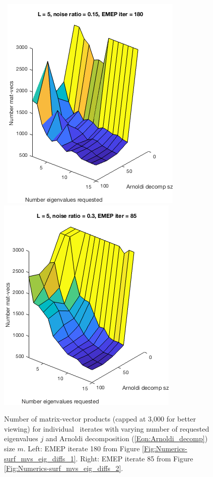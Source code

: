 \begin{figure}[H]
\centering
\hbox{\hspace{-0.3cm} 
	\includegraphics[scale=0.65]{Numerics-surf_mvs_for_m_vs_j_1}
	\includegraphics[scale=0.65]{Numerics-surf_mvs_for_m_vs_j_2} 
			}
	\vspace{0.0cm}
	\caption{
Number of matrix-vector products (capped at 3,000 for better viewing) for individual \emep \ iterates with varying number of requested eigenvalues $j$ and Arnoldi decomposition (\ref{Eqn:Arnoldi_decomp}) size $m$.  
Left: EMEP iterate 180 from Figure \ref{Fig:Numerics-surf_mvs_eig_diffs_1}.
Right: EMEP iterate 85 from Figure \ref{Fig:Numerics-surf_mvs_eig_diffs_2}.
	}
\label{Fig:Numerics-surf_mvs_for_m_vs_j}
\end{figure}


